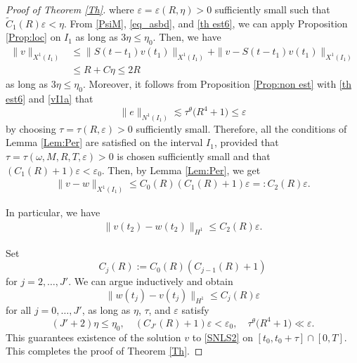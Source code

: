 \documentclass[letterpaper, 11pt,  reqno]{amsart}
\newcommand{\1}{\hspace{0.5mm}\text{I}\hspace{0.5mm}}
\newcommand{\noi}{\noindent}
\newcommand{\eps}{\varepsilon}
\newcommand{\wt}{\widetilde}
\renewcommand{\o}{\omega}
\newcommand{\les}{\lesssim}
\numberwithin{equation}{section}
\numberwithin{theorem}{section}
\begin{document}
\begin{proof}[Proof of Theorem \ref{Th}]
\noi
where $\eps=\eps(R,\eta)>0$
sufficiently small such that 
$\wt C_1(R)\eps<\eta$.
From \eqref{PsiM}, \eqref{eq_asbd}, and \eqref{th est6},
we can apply Proposition \ref{Prop:loc} on $I_1$
as long as $3\eta\le\eta_0$.
Then, we have
\begin{equation}
\begin{aligned}
\|v\|_{X^1(I_1)}
&\le
\|S(t-t_1) v(t_1) \|_{X^1(I_1)}
+
\|v-S(t-t_1) v(t_1) \|_{X^1(I_1)}
\\
&\le
R + C \eta
\le 2R
\end{aligned}
\label{vI1a}
\end{equation}
as long as $3\eta\le\eta_0$.
Moreover,
it follows
from Proposition \ref{Prop:non est}
with \eqref{th est6}  and \eqref{vI1a}
that
\[
\| e \|_{N^1(I_1)}
\les
\tau^\theta
\big(
R^4+1\big)
\le\eps
\]
by choosing $\tau=\tau(R,\eps)>0$ 
sufficiently small.
Therefore, all the conditions of Lemma  \ref{Lem:Per} are satisfied on the interval $I_1$, 
provided that $\tau=\tau(\o, M,R, T, \eps)>0$ 
is chosen sufficiently small and that 
$(C_1(R)+1)\eps<\eps_0$.
Then, by Lemma \ref{Lem:Per},
we get
\begin{align*}
\|v-w\|_{X^1(I_1)}\leq C_0(R)(C_1(R)+1)\eps
=: C_2(R) \eps.
\end{align*}


\noi
In particular, we have
\begin{align*}
    \|v(t_2)-w(t_2)\|_{H^1}\leq C_2(R)\eps.
\end{align*}

Set
\[
C_j(R) := C_0(R) (C_{j-1}(R)+1)
\]
for $j=2,\dots,J'$.
We can argue inductively and obtain
\[
\| w(t_j) - v(t_j) \|_{H^1} \le C_j (R) \eps
\]
for all 
$j=0, \dots, J'$,
as long as
$\eta$, $\tau$, and $\eps$ satisfy
\[
(J'+2) \eta \le \eta_0,
\quad
(C_{J'}(R)+1) \eps < \eps_0,
\quad
\tau^\theta
\big(
R^4 + 1
\big)
\ll \eps.
\]
This guarantees existence of the solution $v$ to \eqref{SNLS2} on
$[t_0,t_0+\tau] \cap [0,T]$.
This completes the proof of Theorem \ref{Th}.
\end{proof}
\end{document}

